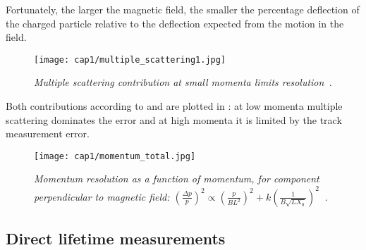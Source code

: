 Fortunately, the larger the magnetic field, the smaller the percentage
deflection of the charged particle relative to the deflection expected from the
motion in the field.
\begin{figure}[!htbp]
  \centering\texttt{[image: cap1/multiple\_scattering1.jpg]}
  \caption{\textit{Multiple scattering contribution at small momenta limits
      resolution~\cite{PDG}.}}\label{multiple_scattering}
\end{figure}
Both contributions according to  and  are plotted in
: at low momenta multiple scattering dominates the error and at
high momenta it is limited by the track measurement error.
\begin{figure}[!htbp]
  \centering\texttt{[image: cap1/momentum\_total.jpg]}
  \caption{\textit{Momentum resolution as a function of momentum, for component
      perpendicular to magnetic field:
      $\left(\frac{\Delta p}{p}\right)^2\propto \left(\frac{p}{BL^2}\right)^2+k
      \left(\frac{1}{B\sqrt{LX_0}}\right)^2$~\cite{Grupen}.}}\label{momentum_t}
\end{figure}







\subsection{Direct lifetime measurements}

